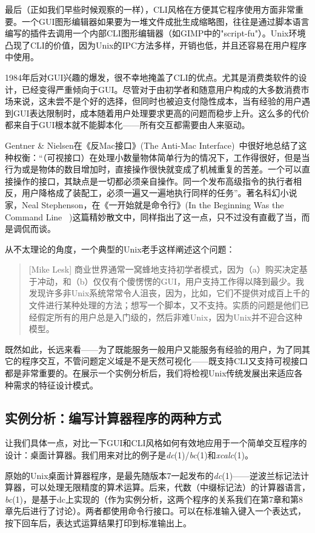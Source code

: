 \documentclass[12pt,oneside]{ctexbook}
\begin{document}
\begin{common-format}
最后（正如我们早些时候观察的一样），CLI风格在方便其它程序使用方面非常重要。一个GUI图形编辑器如果要为一堆文件成批生成缩略图，往往是通过脚本语言编写的插件去调用一个内部CLI图形编辑器（如GIMP中的"script-fu"）。Unix环境凸现了CLI的价值，因为Unix的IPC方法多样，开销也低，并且还容易在用户程序中使用。

1984年后对GUI兴趣的爆发，很不幸地掩盖了CLI的优点。尤其是消费类软件的设计，已经变得严重倾向于GUI。尽管对于由初学者和随意用户构成的大多数消费市场来说，这未尝不是个好的选择，但同时也被迫支付隐性成本，当有经验的用户遇到GUI表达限制时，成本随着用户处理要求更高的问题而稳步上升。这么多的代价都来自于GUI根本就不能脚本化——所有交互都需要由人来驱动。

Gentner \&{} Nielsen在《反Mac接口》(The Anti-Mac Interface)~\cite{Gentner-Nielsen}中很好地总结了这种权衡：“（可视接口）在处理小数量物体简单行为的情况下，工作得很好，但是当行为或是物体的数目增加时，直接操作很快就变成了机械重复的苦差。一个可以直接操作的接口，其缺点是一切都必须亲自操作。同一个发布高级指令的执行者相反，用户降格成了装配工，必须一遍又一遍地执行同样的任务”。著名科幻小说家，Neal Stephenson，在《一开始就是命令行》(In the Beginning Was the Command Line ~\cite{Stephenson})这篇精妙散文中，同样指出了这一点，只不过没有直截了当，而是调侃而谈。

从不太理论的角度，一个典型的Unix老手这样阐述这个问题：
\begin{quote}[Mike Lesk]
商业世界通常一窝蜂地支持初学者模式，因为（a）购买决定基于冲动，和（b）仅仅有个傻愣愣的GUI，用户支持工作得以降到最少。我发现许多非Unix系统常常令人沮丧，因为，比如，它们不提供对成百上千的文件进行某种处理的方法；想写一个脚本，又不支持。实质的问题是他们已经假定所有的用户总是入门级的，然后非难Unix，因为Unix并不迎合这种模型。
\end{quote}

既然如此，长远来看——为了既能服务一般用户又能服务有经验的用户，为了同其它的程序交互，不管问题定义域是不是天然可视化——既支持CLI又支持可视接口都是非常重要的。在展示一个实例分析后，我们将检视Unix传统发展出来适应各种需求的特征设计模式。

\subsection{实例分析：编写计算器程序的两种方式}
让我们具体一点，对比一下GUI和CLI风格如何有效地应用于一个简单交互程序的设计：桌面计算器。我们用来对比的例子是\textit{dc}(1)/\textit{bc}(1)和\textit{xcalc}(1)。

原始的Unix桌面计算器程序，是最先随版本7一起发布的\textit{dc}(1)——逆波兰标记法计算器，可以处理无限精度的算术运算。后来，代数（中缀标记法）的计算器语言，\textit{bc}(1)，是基于dc上实现的（作为实例分析，这两个程序的关系我们在第7章和第8章先后进行了讨论）。两者都使用命令行接口。可以在标准输入键入一个表达式，按下回车后，表达式运算结果打印到标准输出上。


\end{common-format}
\end{document}
